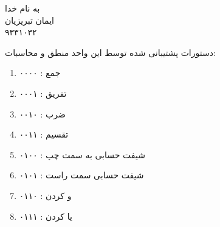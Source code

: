 \documentclass{article}[12pt]
\begin{document}
\begin{centering}
به نام خدا\\
ایمان تبریزیان\\
۹۳۳۱۰۳۲\\
\end{centering}


دستورات پشتیبانی شده توسط این واحد منطق و محاسبات:
\begin{enumerate}
\item ۰۰۰۰ : جمع
\item ۰۰۰۱ :‌ تفریق
\item ۰۰۱۰ : ضرب
\item ۰۰۱۱ : تقسیم
\item ۰۱۰۰ : شیفت حسابی به سمت چپ
\item ۰۱۰۱ : شیفت حسابی سمت راست
\item ۰۱۱۰ : و کردن
\item ۰۱۱۱ : یا کردن
\end{enumerate}
\end{document}
